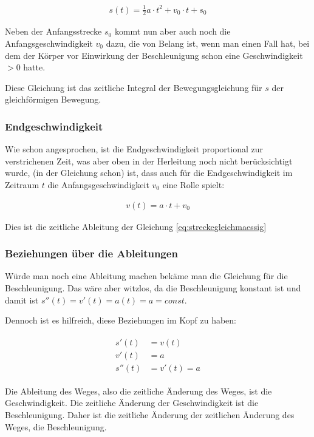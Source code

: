 \begin{align} \label{eq:streckegleichmaessig}
	s(t) = \frac{1}{2}a \cdot t^2 + v_0 \cdot t + s_0
\end{align}

\noindent Neben der Anfangsstrecke $s_0$ kommt nun aber auch noch die Anfangsgeschwindigkeit $v_0$ dazu, die von Belang ist, wenn man einen Fall hat, bei dem der Körper vor Einwirkung der Beschleunigung schon eine Geschwindigkeit $>0$ hatte.

\begin{NiceToKnow}
	Diese Gleichung ist das zeitliche Integral der Bewegungsgleichung für $s$ der gleichförmigen Bewegung.
\end{NiceToKnow}


\subsubsection{Endgeschwindigkeit}

Wie schon angesprochen, ist die Endgeschwindigkeit proportional zur verstrichenen Zeit, was aber oben in der Herleitung noch nicht berücksichtigt wurde, (in der Gleichung schon) ist, dass auch für die Endgeschwindigkeit im Zeitraum $t$ die Anfangsgeschwindigkeit $v_0$ eine Rolle spielt:

\begin{align}	\label{eq:geschwindigkeitgleichmaessig}
	v(t) = a \cdot t + v_0
\end{align}

\noindent Dies ist die zeitliche Ableitung der Gleichung \ref{eq:streckegleichmaessig}


\subsubsection{Beziehungen über die Ableitungen}

Würde man noch eine Ableitung machen bekäme man die Gleichung für die Beschleunigung. Das wäre aber witzlos, da die Beschleunigung konstant ist und damit ist $s''(t)=v'(t)=a(t)=a= const$.

Dennoch ist es hilfreich, diese Beziehungen im Kopf zu haben:

\begin{align}
\begin{split}
	s'(t) &= v(t) \\
	v'(t) &= a \\
	s''(t) &= v'(t)= a
\end{split}
\end{align}

\noindent Die Ableitung des Weges, also die zeitliche Änderung des Weges, ist die Geschwindigkeit. Die zeitliche Änderung der Geschwindigkeit ist die Beschleunigung. Daher ist die zeitliche Änderung der zeitlichen Änderung des Weges, die Beschleunigung.



